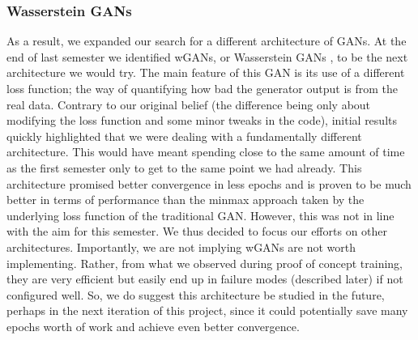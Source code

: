 \documentclass[11pt]{article} %
\begin{document}
\subsubsection{Wasserstein GANs}
As a result, we expanded our search for a different architecture of GANs.
At the end of last semester we identified wGANs, or Wasserstein GANs \cite{arjovsky2017wasserstein}, to be the next architecture we would try.
The main feature of this GAN is its use of a different loss function; the way of quantifying how bad the generator output is from the real data.
Contrary to our original belief (the difference being only about modifying the loss function and some minor tweaks in the code),
initial results quickly highlighted that we were dealing with a fundamentally different architecture.
This would have meant spending close to the same amount of time as the first
 semester only to get to the same point we had already.
This architecture promised better convergence in less epochs and is proven to be
much better in terms of performance than the minmax approach taken by the
underlying loss function of the traditional GAN.
However, this was not in line with the aim for this semester.
We thus decided to focus our efforts on other architectures.
Importantly, we are not implying wGANs are not worth implementing.
Rather, from what we observed during
proof of concept training, they are very efficient but easily end up in failure modes (described later) if not configured well.
So, we do suggest this architecture be studied in the future, perhaps in the next iteration of this project, since it could potentially
save many epochs worth of work and achieve even better convergence.
\end{document}
